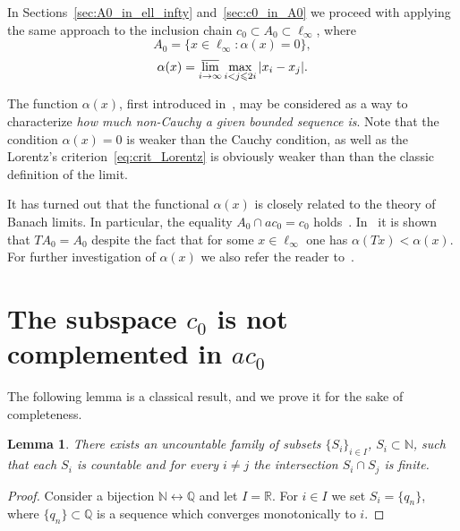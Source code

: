 \documentclass[a4paper,14pt]{article} %
\theoremstyle{plain}
\newtheorem{lemma}[theorem]{Lemma}
\theoremstyle{definition}
\begin{document}
In Sections~\ref{sec:A0_in_ell_infty} and~\ref{sec:c0_in_A0}
we proceed with applying the same approach to the inclusion chain $c_0 \subset A_0 \subset \ell_\infty$,
where
\begin{equation}
	A_0 = \{x\in\ell_\infty: \alpha(x) = 0\}
	,
\end{equation}
\begin{equation}
	\alpha(x) = \varlimsup_{i\to\infty} \max_{i<j\leqslant 2i} |x_i - x_j|
	.
\end{equation}

The function $\alpha(x)$, first introduced in~\cite{our-vzms-2018},
may be considered as a way to characterize \emph{how much non-Cauchy a given bounded sequence is}.
Note that the condition $\alpha(x) =0$ is weaker than the Cauchy condition,
as well as the Lorentz's criterion~\eqref{eq:crit_Lorentz} is obviously weaker than
than the classic definition of the limit.

It has turned out that the functional $\alpha(x)$ is closely related to the theory of Banach limits.
In particular, the equality $A_0\cap ac_0 = c_0$ holds~\cite{avdeev2019space}.
In~\cite{our-ped-2018-alpha-Tx} it is shown that $TA_0 = A_0$ despite the fact that for some $x\in\ell_\infty$
one has $\alpha(Tx)<\alpha(x)$.
For further investigation of $\alpha(x)$ we also refer the reader to~\cite{avdeev2021subsets}.

\section{The subspace $c_0$ is not complemented in $ac_0$}
\label{sec:c0_in_ac0}

The following lemma is a classical result, and we prove it for the sake of completeness.
\begin{lemma}
	\label{lem:uncountable_subsets_of_N_with_finite_intersections}
	There exists an uncountable family of subsets
	$\{S_i\}_{i\in I}$, $S_i \subset \mathbb{N}$,
	such that each $S_i$ is countable and for every $i\neq j$ the intersection $S_i \cap S_j$ is finite.
\end{lemma}

\begin{proof}
	Consider a bijection $\mathbb{N} \leftrightarrow \mathbb{Q}$
	and let $I = \mathbb{R}$.
	For $i\in I$ we set $S_i = \{q_n\}$,
	where $\{q_n\} \subset \mathbb{Q}$ is a sequence which converges monotonically to $i$.
\end{proof}
\end{document}
